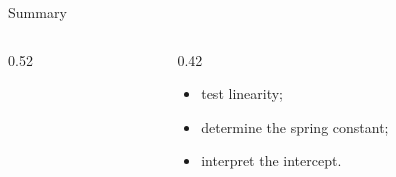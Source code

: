 \documentclass[aspectratio=169,12pt]{beamer}
\begin{document}
\begin{frame}{Summary}
  \begin{columns}[T,onlytextwidth]
    \begin{column}{0.52\textwidth}
    \end{column}
    \begin{column}{0.42\textwidth}
      \begin{itemize}
        \item test linearity;
        \item determine the spring constant;
        \item interpret the intercept.
      \end{itemize}
    \end{column}
  \end{columns}
\end{frame}
\end{document}
